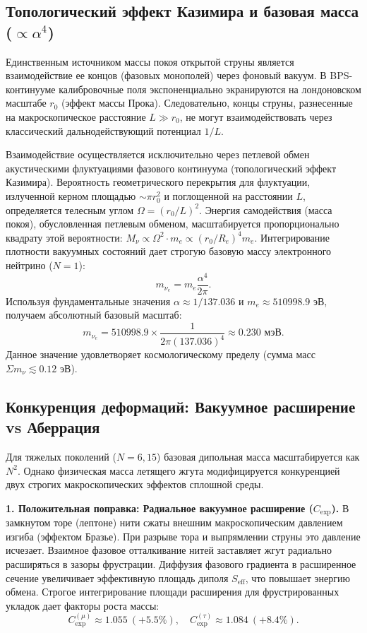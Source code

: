 \documentclass[11pt,a4paper]{article}
\begin{document}
\subsection{Топологический эффект Казимира и базовая масса ($\propto \alpha^4$)}
Единственным источником массы покоя открытой струны является взаимодействие ее концов (фазовых монополей) через фоновый вакуум. 
В BPS-континууме калибровочные поля экспоненциально экранируются на лондоновском масштабе $r_0$ (эффект массы Прока). Следовательно, концы струны, разнесенные на макроскопическое расстояние $L \gg r_0$, не могут взаимодействовать через классический дальнодействующий потенциал $1/L$. 

Взаимодействие осуществляется исключительно через петлевой обмен акустическими флуктуациями фазового континуума (топологический эффект Казимира). Вероятность геометрического перекрытия для флуктуации, излученной керном площадью $\sim \pi r_0^2$ и поглощенной на расстоянии $L$, определяется телесным углом $\Omega = (r_0/L)^2$. Энергия самодействия (масса покоя), обусловленная петлевым обменом, масштабируется пропорционально квадрату этой вероятности: $M_\nu \propto \Omega^2 \cdot m_e \propto (r_0/R_e)^4 m_e$.
Интегрирование плотности вакуумных состояний дает строгую базовую массу электронного нейтрино ($N=1$):
\begin{equation}
	m_{\nu_e} = m_e \frac{\alpha^4}{2\pi}.
\end{equation}
Используя фундаментальные значения $\alpha \approx 1/137.036$ и $m_e \approx 510998.9$ эВ, получаем абсолютный базовый масштаб:
\begin{equation}
	m_{\nu_e} = 510998.9 \times \frac{1}{2\pi (137.036)^4} \approx \mathbf{0.230 \text{ мэВ}}.
\end{equation}
Данное значение удовлетворяет космологическому пределу (сумма масс $\Sigma m_\nu \lesssim 0.12$ эВ).

\subsection{Конкуренция деформаций: Вакуумное расширение vs Аберрация}
Для тяжелых поколений ($N=6, 15$) базовая дипольная масса масштабируется как $N^2$. Однако физическая масса летящего жгута модифицируется конкуренцией двух строгих макроскопических эффектов сплошной среды.

\textbf{1. Положительная поправка: Радиальное вакуумное расширение ($C_{\text{exp}}$).}
В замкнутом торе (лептоне) нити сжаты внешним макроскопическим давлением изгиба (эффектом Бразье). При разрыве тора и выпрямлении струны это давление исчезает. Взаимное фазовое отталкивание нитей заставляет жгут радиально расширяться в зазоры фрустрации. Диффузия фазового градиента в расширенное сечение увеличивает эффективную площадь диполя $S_{\text{eff}}$, что повышает энергию обмена. Строгое интегрирование площади расширения для фрустрированных укладок дает факторы роста массы:
\begin{equation}
	C_{\text{exp}}^{(\mu)} \approx 1.055 \ (+5.5\%), \quad C_{\text{exp}}^{(\tau)} \approx 1.084 \ (+8.4\%).
\end{equation}
\end{document}

